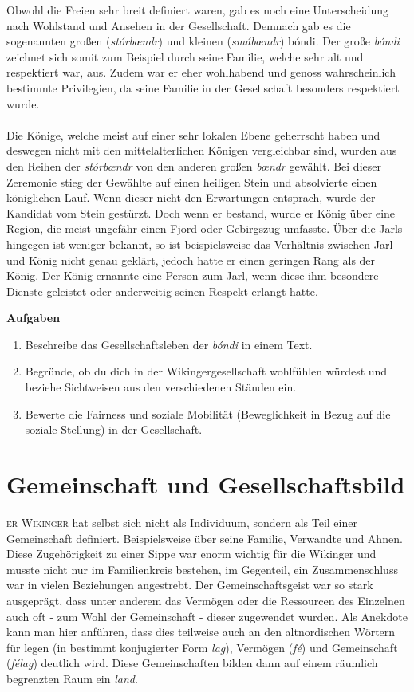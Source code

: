 \documentclass[12pt,a4paper,ngerman,openany]{book}
\newcommand{\flettrine}[2]{\lettrine[lines=2, depth=0, loversize=0.25, nindent=0.69pt, lraise=0.15]{\initfamily{#1}}{#2}}
\newcommand*\initfamily{\usefont{U}{GotIn}{xl}{n}}
\newcommand{\aufgaben}[1]{
  \begin{tcolorbox}
    \textbf{Aufgaben}
    \begin{enumerate}
      #1
    \end{enumerate}
  \end{tcolorbox}
} %
\newcommand{\erklaer}[2]{\leavevmode\marginpar{\footnotesize \textbf{#1:}\\#2}\ignorespaces \textit{#1}} %
\begin{document}
Obwohl die Freien sehr breit definiert waren, gab es noch eine Unterscheidung nach Wohlstand und Ansehen in der Gesellschaft. Demnach gab es die sogenannten großen (\textit{stórbœndr}) und kleinen (\textit{smábœndr}) bóndi. 
Der große \textit{bóndi} zeichnet sich somit zum Beispiel durch seine Familie, welche sehr alt und respektiert war, aus. Zudem war er eher wohlhabend und genoss wahrscheinlich bestimmte Privilegien, da seine Familie in der Gesellschaft besonders respektiert wurde.\\\\
Die Könige, welche meist auf einer sehr lokalen Ebene geherrscht haben und deswegen nicht mit den mittelalterlichen Königen vergleichbar sind, wurden aus den Reihen der \textit{stórbœndr} von den anderen \glqq großen\grqq{} \erklaer{\textit{bœndr}}{Plural von \textit{bóndi}.} gewählt. Bei dieser Zeremonie stieg der Gewählte auf einen heiligen Stein und absolvierte einen königlichen Lauf. Wenn dieser nicht den Erwartungen entsprach, wurde der Kandidat vom Stein gestürzt. Doch wenn er bestand, wurde er König über eine Region, die meist ungefähr einen Fjord oder Gebirgszug umfasste.
Über die Jarls hingegen ist weniger bekannt, so ist beispielsweise das Verhältnis zwischen Jarl und König nicht genau geklärt, jedoch hatte er einen geringen Rang als der König. Der König ernannte eine Person zum Jarl, wenn diese ihm besondere Dienste geleistet oder anderweitig seinen Respekt erlangt hatte.

\aufgaben{
  \item Beschreibe das Gesellschaftsleben der \textit{bóndi} in einem Text.
  \item Begründe, ob du dich in der Wikingergesellschaft wohlfühlen würdest und beziehe Sichtweisen aus den verschiedenen Ständen ein.
  \item Bewerte die Fairness und soziale Mobilität (Beweglichkeit in Bezug auf die soziale Stellung) in der Gesellschaft.
}

\section{Gemeinschaft und Gesellschaftsbild}
\flettrine{D}{er Wikinger} hat selbst sich nicht als Individuum, sondern als Teil einer Gemeinschaft definiert. Beispielsweise über seine Familie, Verwandte und Ahnen. Diese Zugehörigkeit zu einer Sippe war enorm wichtig für die Wikinger und musste nicht nur im Familienkreis bestehen, im Gegenteil, ein Zusammenschluss war in vielen Beziehungen angestrebt. Der Gemeinschaftsgeist war so stark ausgeprägt, dass unter anderem das Vermögen oder die Ressourcen des Einzelnen auch oft - zum Wohl der Gemeinschaft - dieser zugewendet wurden. Als Anekdote kann man hier anführen, dass dies teilweise auch an den altnordischen Wörtern für legen (in bestimmt konjugierter Form \textit{lag}), Vermögen (\textit{fé}) und Gemeinschaft (\textit{félag}) deutlich wird. Diese Gemeinschaften bilden dann auf einem räumlich begrenzten Raum ein \textit{land}.
\end{document}
